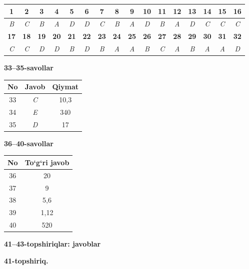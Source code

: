 \documentclass[11pt,a4paper]{article}
\begin{document}
\noindent\begin{tabular}{|c|c|c|c|c|c|c|c|c|c|c|c|c|c|c|c|}\hline
\textbf{1} & \textbf{2} & \textbf{3} & \textbf{4} & \textbf{5} & \textbf{6} & \textbf{7} & \textbf{8} & \textbf{9} & \textbf{10} & \textbf{11} & \textbf{12} & \textbf{13} & \textbf{14} & \textbf{15} & \textbf{16}\\\hline
\textsl{B} & \textsl{C} & \textsl{B} & \textsl{A} & \textsl{D} & \textsl{D} & \textsl{C} & \textsl{B} & \textsl{A} & \textsl{D} & \textsl{B} & \textsl{A} & \textsl{D} & \textsl{C} & \textsl{C} & \textsl{C}\\\hline
\textbf{17} & \textbf{18} & \textbf{19} & \textbf{20} & \textbf{21} & \textbf{22} & \textbf{23} & \textbf{24} & \textbf{25} & \textbf{26} & \textbf{27} & \textbf{28} & \textbf{29} & \textbf{30} & \textbf{31} & \textbf{32}\\\hline
\textsl{C} & \textsl{C} & \textsl{D} & \textsl{D} & \textsl{B} & \textsl{D} & \textsl{B} & \textsl{A} & \textsl{A} & \textsl{B} & \textsl{C} & \textsl{A} & \textsl{B} & \textsl{A} & \textsl{A} & \textsl{D}\\\hline
\end{tabular}\par\medskip
\noindent\textbf{33--35-savollar}\par\smallskip
\noindent\begin{tabular}{|c|c|c|}\hline \textbf{No} & \textbf{Javob} & \textbf{Qiymat}\\\hline
33 & \textsl{C} & 10,3\\\hline
34 & \textsl{E} & 340\\\hline
35 & \textsl{D} & 17\\\hline
\end{tabular}\par\medskip
\noindent\textbf{36--40-savollar}\par\smallskip
\noindent\begin{tabular}{|c|c|}\hline \textbf{No} & \textbf{To`g`ri javob}\\\hline
36 & 20\\\hline
37 & 9\\\hline
38 & 5,6\\\hline
39 & 1,12\\\hline
40 & 520\\\hline
\end{tabular}\par\medskip
\noindent\textbf{41--43-topshiriqlar: javoblar}\par\smallskip
\noindent\textbf{41-topshiriq.}\par
\end{document}
